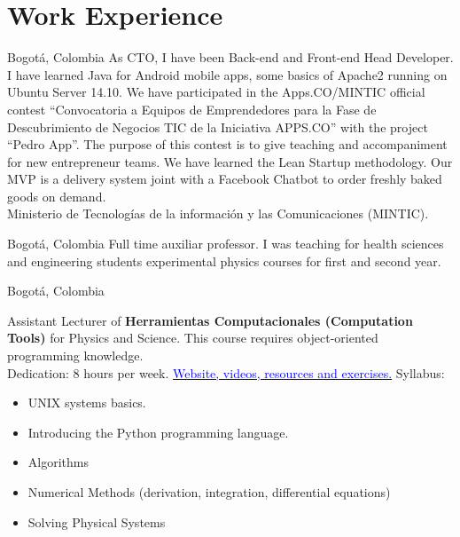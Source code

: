 \documentclass[12pt,letterpaper,sans]{moderncv}
\begin{document}

\section{Work Experience}

{Bogot\'a, Colombia}{}
{
As CTO, I have been Back-end and Front-end Head Developer. I have learned Java for Android
mobile apps, some basics of Apache2 running on Ubuntu Server 14.10. 
We have participated in the Apps.CO/MINTIC official contest 
``Convocatoria a Equipos de Emprendedores para la Fase de Descubrimiento de
Negocios TIC de la Iniciativa APPS.CO'' with the project ``Pedro App''.
The purpose of this contest is to give teaching and accompaniment for new entrepreneur 
teams.
We have learned the Lean Startup methodology. Our MVP is a delivery system joint with a 
Facebook Chatbot to order freshly baked goods on demand. \\
Ministerio de Tecnolog\'ias de la informaci\'on y las Comunicaciones (MINTIC).
}

{Bogot\'a, Colombia}{}
{Full time auxiliar professor. I was teaching for health sciences and engineering 
students experimental physics courses for first and second year.}

{Bogot\'a, Colombia}{}
{Assistant Lecturer of \textbf{Herramientas Computacionales (Computation Tools)} for 
Physics and  Science. This course requires object-oriented programming knowledge. 
\\Dedication: 8 hours per week.
\newline
\href{https://github.com/ComputoCienciasUniandes/HerramientasComputacionales/tree/master/Lectures/98.Python}
{\textcolor{blue}{Website, videos, resources and exercises.}}
\newline{}
Syllabus:
\begin{itemize}
\item UNIX systems basics.
\item Introducing the Python programming language.
\item Algorithms
\item Numerical Methods (derivation, integration, differential equations)
\item Solving Physical Systems
\end{itemize}}
\end{document}
